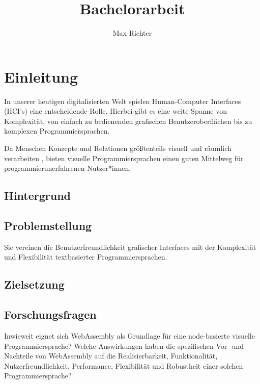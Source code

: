 \documentclass[ngerman]{article}
\title{Bachelorarbeit}
\author{Max Richter}
\begin{document}
\pagestyle{fancy}
\fancyhead{} %
\fancyfoot{} %
\fancyfoot[LE,RO]{\thepage}

\raggedright

\maketitle
\pagebreak

\tableofcontents

\pagebreak

\section{Einleitung}
In unserer heutigen digitalisierten Welt spielen Human-Computer Interfaces (HCI's) eine entscheidende Rolle.
Hierbei gibt es eine weite Spanne von Komplexität, von einfach zu bedienenden grafischen Benutzeroberflächen bis zu komplexen Programmiersprachen. 

Da Menschen Konzepte und Relationen größtenteils visuell und räumlich verarbeiten \cite{smith1975pygmalion}, bieten visuelle Programmiersprachen einen guten Mittelweg für programmierunerfahrenen Nutzer*innen. 
 
\subsection{Hintergrund}
\subsection{Problemstellung}
Sie vereinen die Benutzerfreundlichkeit grafischer Interfaces mit der Komplexität und Flexibilität textbasierter Programmiersprachen. 
\subsection{Zielsetzung}
\subsection{Forschungsfragen}

Inwieweit eignet sich WebAssembly als Grundlage für eine node-basierte visuelle Programmiersprache?  
\linebreak
\linebreak
Welche Auswirkungen haben die spezifischen Vor- und Nachteile von WebAssembly auf die Realisierbarkeit, Funktionalität, Nutzerfreundlichkeit, Performance, Flexibilität und Robustheit einer solchen Programmiersprache?
\end{document}
